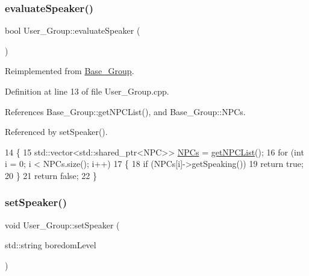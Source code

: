 \subsubsection{\texorpdfstring{evaluate\+Speaker()}{evaluateSpeaker()}}
{\footnotesize\ttfamily bool User\+\_\+\+Group\+::evaluate\+Speaker (\begin{DoxyParamCaption}{ }\end{DoxyParamCaption})\hspace{0.3cm}{\ttfamily [virtual]}}



Reimplemented from \hyperlink{class_base___group_a8264ff598ce7e789c6419e2e6eef08fd}{Base\+\_\+\+Group}.



Definition at line 13 of file User\+\_\+\+Group.\+cpp.



References Base\+\_\+\+Group\+::get\+N\+P\+C\+List(), and Base\+\_\+\+Group\+::\+N\+P\+Cs.



Referenced by set\+Speaker().


\begin{DoxyCode}
14 \{
15     std::vector<std::shared\_ptr<NPC>> \hyperlink{class_base___group_a4757f3c06c73eea029f71b871c1d863e}{NPCs} = \hyperlink{class_base___group_a75eec9132aaf532b4429e0af76b31775}{getNPCList}();
16     \textcolor{keywordflow}{for} (\textcolor{keywordtype}{int} i = 0; i < NPCs.size(); i++)
17     \{
18         \textcolor{keywordflow}{if} (NPCs[i]->getSpeaking())
19             \textcolor{keywordflow}{return} \textcolor{keyword}{true};
20     \}
21     \textcolor{keywordflow}{return} \textcolor{keyword}{false};
22 \}
\end{DoxyCode}
\mbox{\label{class_user___group_aeb67757a4645ae32ea0b9c426fece2de}} 
\subsubsection{\texorpdfstring{set\+Speaker()}{setSpeaker()}}
{\footnotesize\ttfamily void User\+\_\+\+Group\+::set\+Speaker (\begin{DoxyParamCaption}\item[{std\+::string}]{boredom\+Level }\end{DoxyParamCaption})\hspace{0.3cm}{\ttfamily [virtual]}}



